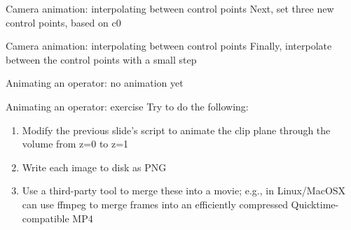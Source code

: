 \begin{frame}{Camera animation: interpolating between control points}
  Next, set three new control points, based on c0
  
\end{frame}

\begin{frame}{Camera animation: interpolating between control points}
  Finally, interpolate between the control points with a small step
  
\end{frame}

\begin{frame}{Animating an operator: no animation yet}
  
\end{frame}


\begin{frame}{Animating an operator: exercise}
  \qquad Try to do the following:\bigskip
  \begin{enumerate}\setlength{\itemsep}{3mm}
  \item Modify the previous slide's script to animate the clip plane through the volume from z=0 to z=1
  \item Write each image to disk as PNG
  \item Use a third-party tool to merge these into a movie;
    e.g., in Linux/MacOSX can use ffmpeg to merge frames into an efficiently compressed
    Quicktime-compatible MP4\ffmpeg
  \end{enumerate}
\end{frame}


